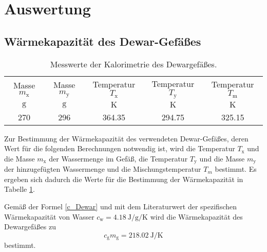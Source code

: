 \section{Auswertung}
\label{sec:Auswertung}
\subsection{Wärmekapazität des Dewar-Gefäßes}
\begin{table}[ht]
	\centering
	\begin{tabular}{ccccc}%
		\toprule
		{Masse $m_\text{x}$}& {Masse $m_\text{y}$}  &{Temperatur  $T_\text{x}$}&{Temperatur $T_\text{y}$}  &{Temperatur $T_\text{m}$}\\
		{$\si{\gram}$}& {$\si{\gram}$}  &{$\si{\kelvin}$}& {$\si{\kelvin}$}  &{$\si{\kelvin}$}\\
		\midrule
		270 & 296 & 364.35 & 294.75 & 325.15\\
		\bottomrule
	\end{tabular}
	\caption{Messwerte der Kalorimetrie des Dewargefäßes.}
	\label{tab:messung1}
\end{table}
Zur Bestimmung der Wärmekapazität des verwendeten Dewar-Gefäßes, deren Wert für die folgenden Berechnungen notwendig ist,
wird die Temperatur $T_\text{x}$ und die Masse $m_\text{x}$ der Wassermenge im Gefäß, die Temperatur $T_\text{y}$ und die Masse $m_\text{y}$ der hinzugefügten Wassermenge und die Mischungstemperatur $T_m$ bestimmt.
Es ergeben sich dadurch die Werte für die Bestimmung der Wärmekapazität in Tabelle \ref{tab:messung1}.

Gemäß der Formel \eqref{c_Dewar}
und mit dem Literaturwert\cite{NO} der spezifischen Wärmekapazität von Wasser
$c_\text{w}=\SI{4.18}{\joule\per\gram\per\kelvin}$ wird die Wärmekapazität des Dewargefäßes zu
\begin{equation}
	c_\mathup{g}m_\mathup{g}=\SI{218.02}{\joule\per\kelvin}
	\label{wert:waerme_dewar}
\end{equation}
bestimmt.

